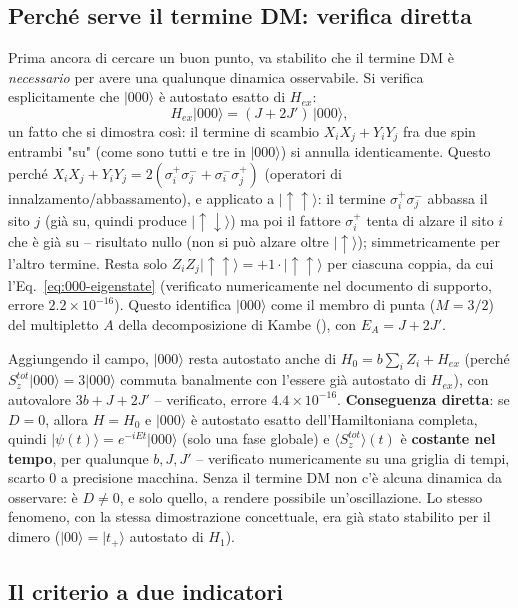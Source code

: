 \documentclass[11pt,a4paper]{article}
\newcommand{\ket}[1]{\lvert #1 \rangle}
\begin{document}
\subsection{Perché serve il termine DM: verifica diretta}

Prima ancora di cercare un buon punto, va stabilito che il termine DM è
\emph{necessario} per avere una qualunque dinamica osservabile. Si
verifica esplicitamente che $\ket{000}$ è autostato esatto di $H_{ex}$:
\begin{equation}
H_{ex}\ket{000} = (J+2J')\,\ket{000},
\label{eq:000-eigenstate}
\end{equation}
un fatto che si dimostra così: il termine di scambio $X_iX_j+Y_iY_j$ fra
due spin entrambi "su" (come sono tutti e tre in $\ket{000}$) si annulla
identicamente. Questo perché $X_iX_j+Y_iY_j = 2(\sigma_i^+\sigma_j^- +
\sigma_i^-\sigma_j^+)$ (operatori di innalzamento/abbassamento), e
applicato a $\ket{\uparrow\uparrow}$: il termine $\sigma_i^+\sigma_j^-$
abbassa il sito $j$ (già su, quindi produce $\ket{\uparrow\downarrow}$)
ma poi il fattore $\sigma_i^+$ tenta di alzare il sito $i$ che è già su
-- risultato nullo (non si può alzare oltre $\ket\uparrow$); simmetricamente
per l'altro termine. Resta solo $Z_iZ_j\ket{\uparrow\uparrow}=+1\cdot\ket{\uparrow\uparrow}$
per ciascuna coppia, da cui l'Eq.~\eqref{eq:000-eigenstate} (verificato
numericamente nel documento di supporto, errore $2.2\times10^{-16}$).
Questo identifica $\ket{000}$ come il membro di punta ($M=3/2$) del
multipletto $A$ della decomposizione di Kambe (\texttt{}),
con $E_A=J+2J'$.

Aggiungendo il campo, $\ket{000}$ resta autostato anche di
$H_0=b\sum_iZ_i+H_{ex}$ (perché $S_z^{tot}\ket{000}=3\ket{000}$ commuta
banalmente con l'essere già autostato di $H_{ex}$), con autovalore
$3b+J+2J'$ -- verificato, errore $4.4\times10^{-16}$. \textbf{Conseguenza
diretta}: se $D=0$, allora $H=H_0$ e $\ket{000}$ è autostato esatto
dell'Hamiltoniana completa, quindi $\ket{\psi(t)}=e^{-iEt}\ket{000}$
(solo una fase globale) e $\langle S_z^{tot}\rangle(t)$ è \textbf{costante
nel tempo}, per qualunque $b,J,J'$ -- verificato numericamente su una
griglia di tempi, scarto $0$ a precisione macchina. Senza il termine DM
non c'è alcuna dinamica da osservare: è $D\neq0$, e solo quello, a rendere
possibile un'oscillazione. Lo stesso fenomeno, con la stessa dimostrazione
concettuale, era già stato stabilito per il dimero
($\ket{00}=\ket{t_+}$ autostato di $H_1$).

\subsection{Il criterio a due indicatori}
\end{document}
